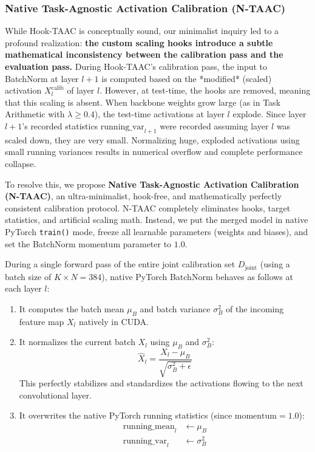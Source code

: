 \documentclass{article}
\theoremstyle{plain}
\theoremstyle{definition}
\theoremstyle{remark}
\begin{document}
\subsubsection{Native Task-Agnostic Activation Calibration (N-TAAC)}
While Hook-TAAC is conceptually sound, our minimalist inquiry led to a profound realization: \textbf{the custom scaling hooks introduce a subtle mathematical inconsistency between the calibration pass and the evaluation pass.} During Hook-TAAC's calibration pass, the input to BatchNorm at layer $l+1$ is computed based on the *modified* (scaled) activation $X_l^{\text{calib}}$ of layer $l$. However, at test-time, the hooks are removed, meaning that this scaling is absent. When backbone weights grow large (as in Task Arithmetic with $\lambda \ge 0.4$), the test-time activations at layer $l$ explode. Since layer $l+1$'s recorded statistics $\text{running\_var}_{l+1}$ were recorded assuming layer $l$ was scaled down, they are very small. Normalizing huge, exploded activations using small running variances results in numerical overflow and complete performance collapse.

To resolve this, we propose \textbf{Native Task-Agnostic Activation Calibration (N-TAAC)}, an ultra-minimalist, hook-free, and mathematically perfectly consistent calibration protocol. N-TAAC completely eliminates hooks, target statistics, and artificial scaling math. Instead, we put the merged model in native PyTorch \texttt{train()} mode, freeze all learnable parameters (weights and biases), and set the BatchNorm momentum parameter to $1.0$.

During a single forward pass of the entire joint calibration set $D_{\text{joint}}$ (using a batch size of $K \times N = 384$), native PyTorch BatchNorm behaves as follows at each layer $l$:
\begin{enumerate}
\item It computes the batch mean $\mu_B$ and batch variance $\sigma_B^2$ of the incoming feature map $X_l$ natively in CUDA.
\item It normalizes the current batch $X_l$ using $\mu_B$ and $\sigma_B^2$:
\begin{equation}
\hat{X}_l = \frac{X_l - \mu_B}{\sqrt{\sigma_B^2 + \epsilon}}
\end{equation}
This perfectly stabilizes and standardizes the activations flowing to the next convolutional layer.
\item It overwrites the native PyTorch running statistics (since $\text{momentum} = 1.0$):
\begin{align}
\text{running\_mean}_l &\leftarrow \mu_B \\
\text{running\_var}_l &\leftarrow \sigma_B^2
\end{align}
\end{enumerate}
\end{document}
